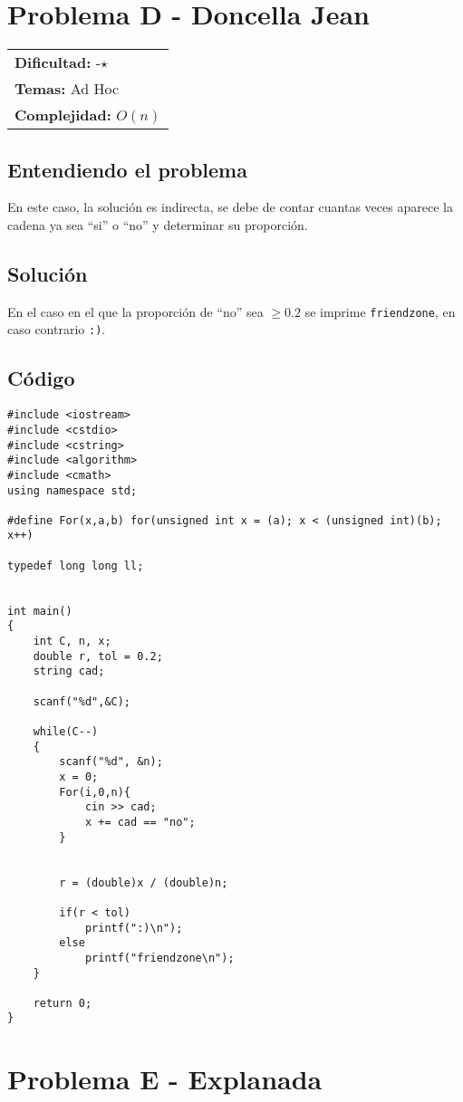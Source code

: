 \section{Problema D - Doncella Jean}

\hfill
\begin{tabular}{@{}l@{}}
\textbf{Dificultad:} -$\star$ \\
\textbf{Temas:} Ad Hoc \\
\textbf{Complejidad:} $O(n)$
\end{tabular}

\subsection*{Entendiendo el problema}
En este caso, la solución es indirecta, se debe de contar cuantas veces aparece la cadena ya sea ``si'' o ``no'' y determinar su proporción.

\subsection*{Solución}
En el caso en el que la proporción de ``no'' sea $\geq 0{.}2$ se imprime \texttt{friendzone}, en caso contrario \texttt{:)}.

\subsection*{Código}
\begin{verbatim}
#include <iostream>
#include <cstdio>
#include <cstring>
#include <algorithm>
#include <cmath>
using namespace std;

#define For(x,a,b) for(unsigned int x = (a); x < (unsigned int)(b); x++)

typedef long long ll;


int main()
{
	int C, n, x;
	double r, tol = 0.2;
	string cad;

	scanf("%d",&C);

	while(C--)
	{
		scanf("%d", &n);
		x = 0;
		For(i,0,n){
			cin >> cad;
			x += cad == "no";
		}


		r = (double)x / (double)n;

		if(r < tol)
			printf(":)\n");
		else
			printf("friendzone\n");
	}
	
	return 0;
}
\end{verbatim}

\section{Problema E - Explanada}

